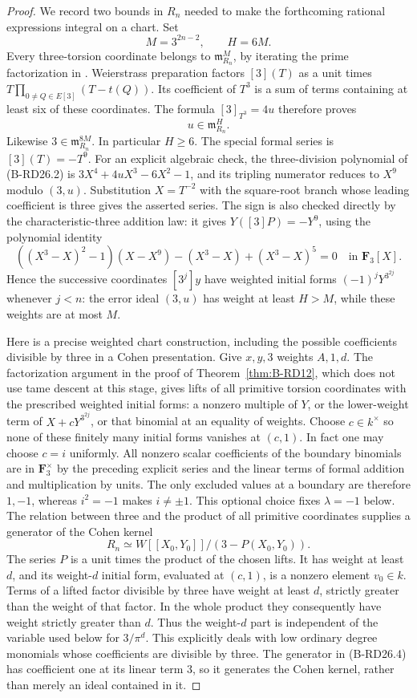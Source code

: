 \begin{proof}
We record two bounds in $R_n$ needed to make the forthcoming
rational expressions integral on a chart. Set
\[
               M=3^{2n-2},\qquad H=6M.
\]
Every three-torsion coordinate belongs to
$\mathfrak m_{R_n}^{M}$, by iterating the prime factorization in
\cite[Proposition~2.2.3(vii)]{CarterStrauch2021LubinTate}.
Weierstrass preparation factors $[3](T)$ as a unit times
$T\prod_{0\ne Q\in E[3]}(T-t(Q))$. Its coefficient of $T^3$
is a sum of terms containing at least six of these coordinates.
The formula $[3]_{T^3}=4u$ therefore proves
\[
                    u\in\mathfrak m_{R_n}^{H}.          \tag{B-RD26.3}
\]
Likewise $3\in\mathfrak m_{R_n}^{8M}$. In particular $H\geq6$.
The special formal series is $[3](T)=-T^9$. For an explicit
algebraic check, the three-division polynomial of (B-RD26.2) is
$3X^4+4uX^3-6X^2-1$, and its tripling numerator reduces to $X^9$
modulo $(3,u)$. Substitution $X=T^{-2}$ with the square-root
branch whose leading coefficient is three gives the asserted
series. The sign is also checked directly by the characteristic-three
addition law: it gives $Y([3]P)=-Y^9$, using the polynomial identity
\[
 ((X^3-X)^2-1)(X-X^9)-(X^3-X)+(X^3-X)^5=0
                                      \quad\text{in }\mathbf F_3[X].
\]
Hence the successive coordinates $[3^j]y$ have weighted
initial forms $(-1)^jY^{3^{2j}}$ whenever $j<n$: the error ideal
$(3,u)$ has weight at least $H>M$, while these weights are at
most $M$.

Here is a precise weighted chart construction, including the
possible coefficients divisible by three in a Cohen presentation.
Give $x,y,3$ weights $A,1,d$. The factorization argument in the
proof of Theorem~\ref{thm:B-RD12}, which does not use tame descent
at this stage, gives lifts of all primitive torsion coordinates
with the prescribed weighted initial forms: a nonzero multiple
of $Y$, or the lower-weight term of $X+cY^{3^{2j}}$, or that
binomial at an equality of weights. Choose $c\in k^\times$ so
none of these finitely many initial forms vanishes at $(c,1)$.
In fact one may choose $c=i$ uniformly. All nonzero scalar
coefficients of the boundary binomials are in $\mathbf F_3^\times$
by the preceding explicit series and the linear terms of formal
addition and multiplication by units. The only excluded values
at a boundary are therefore $1,-1$, whereas $i^2=-1$ makes
$i\ne\pm1$. This optional choice fixes $\lambda=-1$ below.
The relation between three and the product of all primitive
coordinates supplies a generator of the Cohen kernel
\[
          R_n\simeq W[[X_0,Y_0]]/(3-P(X_0,Y_0)).        \tag{B-RD26.4}
\]
The series $P$ is a unit times the product of the chosen lifts.
It has weight at least $d$, and its weight-$d$ initial form,
evaluated at $(c,1)$, is a nonzero element $v_0\in k$.
Terms of a lifted factor divisible by three have weight at least
$d$, strictly greater than the weight of that factor. In the
whole product they consequently have weight strictly greater
than $d$. Thus the weight-$d$ part is independent of the variable
used below for $3/\pi^d$. This explicitly deals with low ordinary
degree monomials whose coefficients are divisible by three.
The generator in (B-RD26.4) has coefficient one at its linear
term $3$, so it generates the Cohen kernel, rather than merely
an ideal contained in it.


\end{proof}
